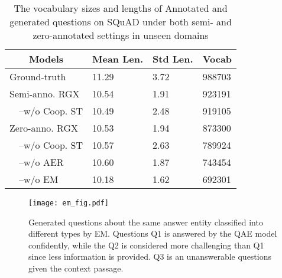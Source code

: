\documentclass[11pt,a4paper]{article}
\begin{document}
\begin{table}[h]
\small
\centering
\begin{tabular}{@{}llll@{}}
\toprule
\multicolumn{1}{c}{\textbf{Models}} & \multicolumn{1}{c}{\textbf{Mean Len.}} & \multicolumn{1}{c}{\textbf{Std Len.}} & \multicolumn{1}{c}{\textbf{Vocab}} \\ \midrule

Ground-truth               & 11.29                          & 3.72                          & 988703                         \\
Semi-anno. RGX               & 10.54                          & 1.91                          & 923191                         \\
$\quad$--w/o Coop. ST               & 10.49                          & 2.48                          & 919105                         \\
Zero-anno. RGX               & 10.53                          & 1.94                          & 873300                         \\
$\quad$--w/o Coop. ST               & 10.57                          & 2.63                          & 789924                         \\
$\quad$--w/o AER               & 10.60                          & 1.87                          & 743454                        \\
$\quad$--w/o EM               & 10.18                          & 1.62                          & 692301                          \\
\bottomrule
\end{tabular}
\caption{The vocabulary sizes and lengths of Annotated and generated questions on SQuAD under both semi- and zero-annotated settings in unseen domains}
\label{tab:ques-stat}
\end{table}

\begin{figure}[t]
\centering
\texttt{[image: em\_fig.pdf]}
\caption{Generated questions about the same answer entity classified into different types by EM. Questions Q1 is answered by the QAE model confidently, while the Q2 is considered more challenging than Q1 since less information is provided. Q3 is an unanswerable questions given the context passage.}
\label{fig:em_example}
\end{figure}
\end{document}
